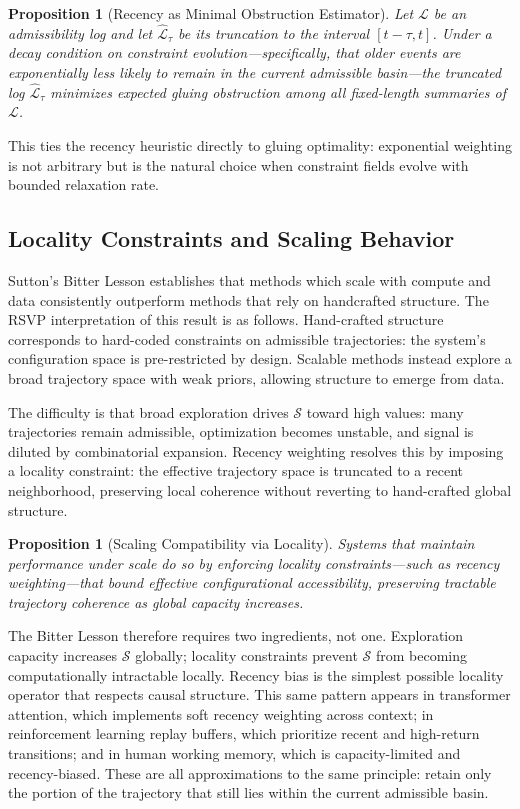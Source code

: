 \documentclass[11pt, a4paper, twocolumn]{article}
\newtheorem{proposition}[definition]{Proposition}
\newcommand{\Sfield}{\mathcal{S}}
\begin{document}
\begin{proposition}[Recency as Minimal Obstruction Estimator]
Let $\mathcal{L}$ be an admissibility log and let $\widehat{\mathcal{L}}_\tau$
be its truncation to the interval $[t-\tau,t]$. Under a decay condition on
constraint evolution---specifically, that older events are exponentially less
likely to remain in the current admissible basin---the truncated log
$\widehat{\mathcal{L}}_\tau$ minimizes expected gluing obstruction among all
fixed-length summaries of $\mathcal{L}$.
\end{proposition}

This ties the recency heuristic directly to gluing optimality: exponential
weighting is not arbitrary but is the natural choice when constraint fields
evolve with bounded relaxation rate.

\subsection{Locality Constraints and Scaling Behavior}

Sutton's Bitter Lesson establishes that methods which scale with compute and
data consistently outperform methods that rely on handcrafted structure. The
RSVP interpretation of this result is as follows. Hand-crafted structure
corresponds to hard-coded constraints on admissible trajectories: the system's
configuration space is pre-restricted by design. Scalable methods instead
explore a broad trajectory space with weak priors, allowing structure to emerge
from data.

The difficulty is that broad exploration drives $\Sfield$ toward high values:
many trajectories remain admissible, optimization becomes unstable, and signal
is diluted by combinatorial expansion. Recency weighting resolves this by
imposing a locality constraint: the effective trajectory space is truncated to
a recent neighborhood, preserving local coherence without reverting to
hand-crafted global structure.

\begin{proposition}[Scaling Compatibility via Locality]
Systems that maintain performance under scale do so by enforcing locality
constraints---such as recency weighting---that bound effective configurational
accessibility, preserving tractable trajectory coherence as global capacity
increases.
\end{proposition}

The Bitter Lesson therefore requires two ingredients, not one. Exploration
capacity increases $\Sfield$ globally; locality constraints prevent $\Sfield$
from becoming computationally intractable locally. Recency bias is the simplest
possible locality operator that respects causal structure. This same pattern
appears in transformer attention, which implements soft recency weighting across
context; in reinforcement learning replay buffers, which prioritize recent and
high-return transitions; and in human working memory, which is capacity-limited
and recency-biased. These are all approximations to the same principle: retain
only the portion of the trajectory that still lies within the current admissible
basin.
\end{document}
